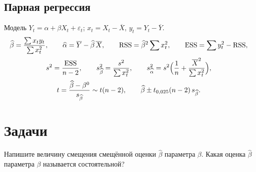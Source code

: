 \subsection{Парная регрессия}\label{sec:pair}

Модель $Y_t = \alpha + \beta X_t + \varepsilon_t$; $x_t = X_t - \overline{X}$,
$y_t = Y_t - \overline{Y}$.
\begin{gather}
  \widehat{\beta} = \frac{\sum x_ty_t}{\sum x_t^2},
  \qquad
  \widehat{\alpha} = \overline{Y} - \widehat{\beta}\,\overline{X},
  \qquad
  \mathrm{RSS} = \widehat{\beta}^2\sum x_t^2,
  \qquad
  \mathrm{ESS} = \sum y_t^2 - \mathrm{RSS},
  \label{eq:ols} \\[2pt]
  s^2 = \frac{\mathrm{ESS}}{n-2},
  \qquad
  s^2_{\widehat{\beta}} = \frac{s^2}{\sum x_t^2},
  \qquad
  s^2_{\widehat{\alpha}} = s^2\Bigl(\frac{1}{n} + \frac{\overline{X}^2}{\sum x_t^2}\Bigr),
  \label{eq:s2} \\[2pt]
  t = \frac{\widehat{\beta} - \beta^0}{s_{\widehat{\beta}}} \sim t(n-2),
  \qquad
  \widehat{\beta} \pm t_{0{,}025}(n-2)\,s_{\widehat{\beta}} .
  \label{eq:t}
\end{gather}
\fi

\section{Задачи}


Напишите величину смещения смещённой оценки $\widehat{\beta}$ параметра
$\beta$. Какая оценка $\widehat{\beta}$ параметра $\beta$ называется
состоятельной?

